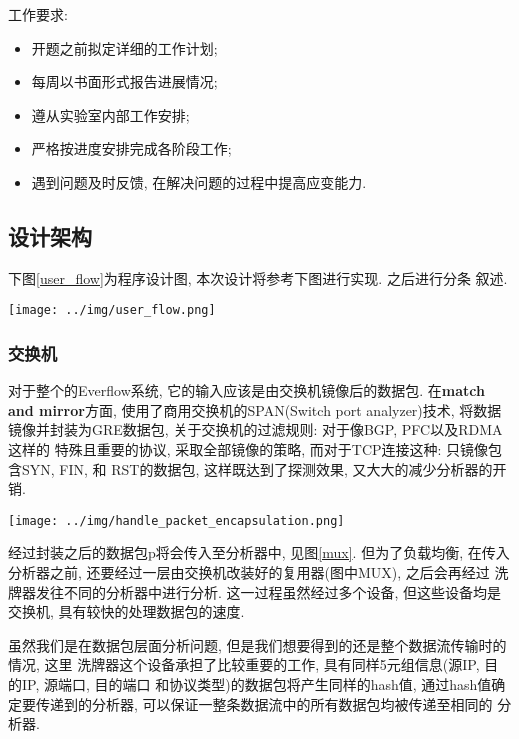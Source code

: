 {\begin{mdframed}[everyline=true]
工作要求:
\begin{itemize}
    \setlength\itemsep{0.1em}
    \item 开题之前拟定详细的工作计划;
    \item 每周以书面形式报告进展情况;
    \item 遵从实验室内部工作安排;
    \item 严格按进度安排完成各阶段工作;
    \item 遇到问题及时反馈, 在解决问题的过程中提高应变能力.
\end{itemize}

\subsection{设计架构}

  下图\ref{user_flow}为程序设计图, 本次设计将参考下图进行实现. 之后进行分条
叙述.

\begin{center}
    \texttt{[image: ../img/user\_flow.png]}
    \label{user_flow}
\end{center}

\subsubsection{交换机}

  对于整个的Everflow系统, 它的输入应该是由交换机镜像后的数据包.
在\textbf{match and mirror}方面,
使用了商用交换机的SPAN(Switch port analyzer)技术,
将数据镜像并封装为GRE数据包, 关于交换机的过滤规则: 对于像BGP,
PFC以及RDMA这样的 特殊且重要的协议, 采取全部镜像的策略,
而对于TCP连接这种: 只镜像包含SYN, FIN, 和 RST的数据包,
这样既达到了探测效果, 又大大的减少分析器的开销.

\begin{center}
    \texttt{[image: ../img/handle\_packet\_encapsulation.png]}
    \label{mux}
\end{center}

经过封装之后的数据包p将会传入至分析器中, 见图\ref{mux}. 但为了负载均衡,
在传入分析器之前, 还要经过一层由交换机改装好的复用器(图中MUX),
之后会再经过 洗牌器发往不同的分析器中进行分析. 这一过程虽然经过多个设备,
但这些设备均是交换机, 具有较快的处理数据包的速度.

虽然我们是在数据包层面分析问题,
但是我们想要得到的还是整个数据流传输时的情况, 这里
洗牌器这个设备承担了比较重要的工作, 具有同样5元组信息(源IP, 目的IP,
源端口, 目的端口 和协议类型)的数据包将产生同样的hash值,
通过hash值确定要传递到的分析器,
可以保证一整条数据流中的所有数据包均被传递至相同的 分析器.


\end{mdframed}}
